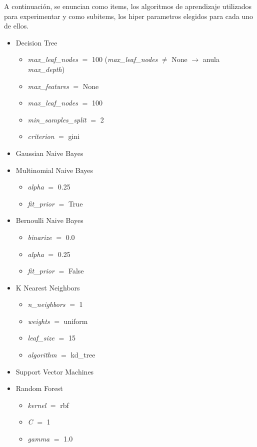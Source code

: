 \documentclass[hidelinks,a4paper,11pt, nofootinbib]{article}
\begin{document}
A continuación, se enuncian como items, los algoritmos de aprendizaje utilizados para experimentar y como subitems, los hiper parametros elegidos para cada uno de ellos.  
\begin{itemize}
    \item Decision Tree
        \begin{itemize}
            \item \textit{max\_leaf\_nodes} $=$ 100 (\textit{max\_leaf\_nodes} $\neq$ None $\rightarrow$ anula \textit{max\_depth})
            \item \textit{max\_features} $=$ None
            \item \textit{max\_leaf\_nodes} $=$ 100
            \item \textit{min\_samples\_split} $=$ 2
            \item \textit{criterion} $=$ gini
        \end{itemize}
    \item Gaussian Naive Bayes
    \item Multinomial Naive Bayes
        \begin{itemize}
            \item \textit{alpha} $=$ 0.25 
            \item \textit{fit\_prior} $=$ True 
        \end{itemize}
    \item Bernoulli Naive Bayes
        \begin{itemize}
            \item \textit{binarize} $=$ 0.0 
            \item \textit{alpha} $=$ 0.25
            \item \textit{fit\_prior} $=$ False
        \end{itemize}
    \item K Nearest Neighbors
        \begin{itemize}
            \item \textit{n\_neighbors} $=$ 1
            \item \textit{weights} $=$ uniform
            \item \textit{leaf\_size} $=$ 15
            \item \textit{algorithm} $=$ kd\_tree
        \end{itemize}
    \item Support Vector Machines
    \item Random Forest
        \begin{itemize}
            \item \textit{kernel} $=$ rbf 
            \item \textit{C} $=$ 1 
            \item \textit{gamma} $=$ 1.0
        \end{itemize}
\end{itemize}
\end{document}
